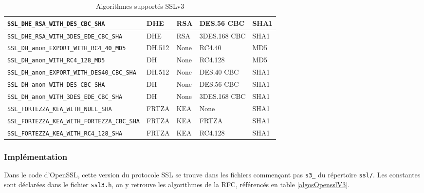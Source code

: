 \begin{table}[H]
\begin{tabularx}{17cm}{|l|l|l|X|l|}
\hline
\verb+SSL_DHE_RSA_WITH_DES_CBC_SHA+ & DHE&RSA&DES.56 CBC&SHA1\\
\hline
\verb+SSL_DHE_RSA_WITH_3DES_EDE_CBC_SHA+ & DHE&RSA&3DES.168 CBC&SHA1\\
\hline 
\verb+SSL_DH_anon_EXPORT_WITH_RC4_40_MD5+ & DH.512&None&RC4.40&MD5\\
\hline
\verb+SSL_DH_anon_WITH_RC4_128_MD5+ & DH&None&RC4.128&MD5\\
\hline
\verb+SSL_DH_anon_EXPORT_WITH_DES40_CBC_SHA+ & DH.512&None&DES.40 CBC&SHA1\\
\hline
\verb+SSL_DH_anon_WITH_DES_CBC_SHA+& DH	&None	&DES.56	CBC&SHA1\\
\hline
\verb+SSL_DH_anon_WITH_3DES_EDE_CBC_SHA+ & DH	&None	&3DES.168 CBC&	SHA1\\
\hline
\verb+SSL_FORTEZZA_KEA_WITH_NULL_SHA+ & FRTZA&	KEA&	None&	SHA1\\
\hline
\verb+SSL_FORTEZZA_KEA_WITH_FORTEZZA_CBC_SHA+ & FRTZA & KEA & FRTZA& SHA1\\
\hline
\verb+SSL_FORTEZZA_KEA_WITH_RC4_128_SHA+ & FRTZA	&KEA&	RC4.128	&SHA1\\
\hline
\end{tabularx}
\caption{Algorithmes supportés SSLv3}
\label{algosV3}
\end{table}


\subsubsection{Implémentation}

Dans le code d'OpenSSL, cette version du protocole SSL se trouve dans les fichiers commençant pas \verb+s3_+ du répertoire \verb+ssl/+. Les constantes sont déclarées dans le fichier \verb+ssl3.h+, on y retrouve les algorithmes de la RFC, référencés en table \ref{algosOpensslV3}.

